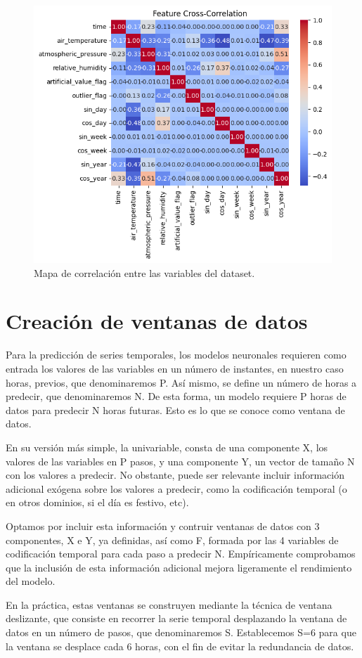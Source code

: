 \begin{figure}
    \centering
    \includegraphics[width=.5\linewidth]{images/correlation_heatmap.png}
    \caption{Mapa de correlación entre las variables del dataset.}
    \label{correlation_map}
\end{figure}

\section{Creación de ventanas de datos}
Para la predicción de series temporales, los modelos neuronales requieren como entrada los valores de las variables en un número de instantes, en nuestro caso horas,
previos, que denominaremos P. Así mismo, se define un número de horas a predecir, que denominaremos N. 
De esta forma, un modelo requiere P horas de datos para predecir N horas futuras. Esto es lo que se conoce como ventana de datos.

En su versión más simple, la univariable, consta de una componente X, los valores de las variables en P pasos, y una componente Y, un vector
de tamaño N con los valores a predecir. 
No obstante, puede ser relevante incluir información adicional exógena sobre los valores a predecir, como la codificación temporal 
(o en otros dominios, si el día es festivo, etc).

Optamos por incluir esta información y contruir ventanas de datos con 3 componentes, X e Y, ya definidas, así como F, formada por las 4 variables de codificación temporal 
para cada paso a predecir N. Empíricamente comprobamos que la inclusión de esta información adicional mejora ligeramente el rendimiento del modelo.

En la práctica, estas ventanas se construyen mediante la técnica de ventana deslizante, que consiste en recorrer la serie temporal desplazando 
la ventana de datos en un número de pasos, que denominaremos S. Establecemos S=6 para que la ventana se desplace cada 6 horas, con el fin de evitar 
la redundancia de datos.

